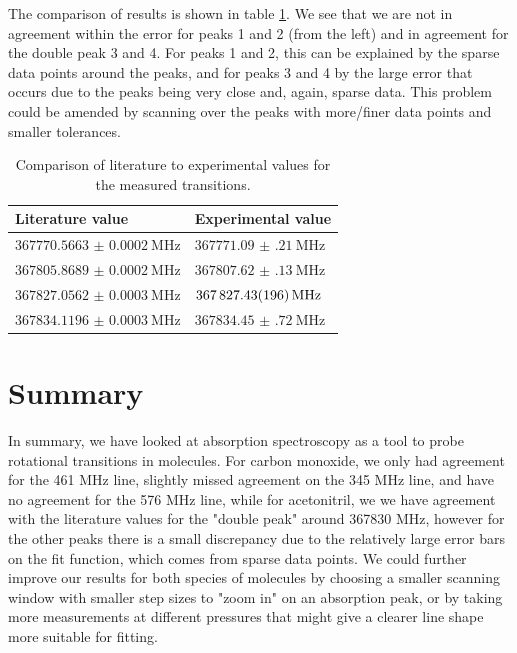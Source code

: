 \documentclass[a4paper,10pt]{scrartcl}
\begin{document}
The comparison of results is shown in table \ref{tab:aceto}. We see that we are not in agreement within the error for peaks 1 and 2 (from the left) and in agreement for the double peak 3 and 4. For peaks 1 and 2, this can be explained by the sparse data points around the peaks, and for peaks 3 and 4 by the large error that occurs due to the peaks being very close and, again, sparse data. This problem could be amended by scanning over the peaks with more/finer data points and smaller tolerances.

\begin{table}[H]
\centering
    \begin{tabular}{l|l}
    Literature value \cite{cdms}       & Experimental value                    \\ \hline
     $\SI{367770.5663(2)}{\mega\hertz}$ & $\SI{367771.09(21)}{\mega\hertz}$     \\
     $\SI{367805.8689(2)}{\mega\hertz}$ & $\SI{367807.62(13)}{\mega\hertz}$     \\
    $\SI{367827.0562(3)}{\mega\hertz}$ & $\SI{367827.43 \pm 1.96}{\mega\hertz}$ \\
    $\SI{367834.1196(3)}{\mega\hertz}$ & $\SI{367834.45(72)}{\mega\hertz}$     \\
    \hline
    \end{tabular}
    \caption{Comparison of literature to experimental values for the measured transitions.\label{tab:aceto}}
\end{table}


%
%
%

\section{Summary}

In summary, we have looked at absorption spectroscopy as a tool to probe rotational transitions in molecules. For carbon monoxide, we only had agreement for the 461 MHz line, slightly missed agreement on the 345 MHz line, and have no agreement for the 576 MHz line, while for acetonitril, we we have agreement with the literature values for the "double peak" around 367830 MHz, however for the other peaks there is a small discrepancy due to the relatively large error bars on the fit function, which comes from sparse data points. 
We could further improve our results for both species of molecules by choosing a smaller scanning window with smaller step sizes to "zoom in" on an absorption peak, or by taking more measurements at different pressures that might give a clearer line shape more suitable for fitting.
\end{document}
